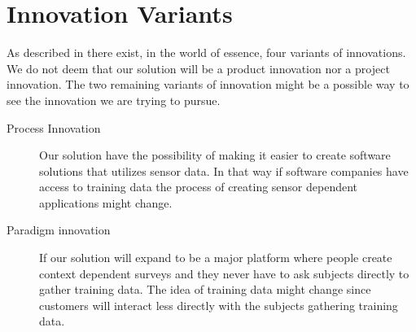 
\section{Innovation Variants}
\label{sec:innovation_variants}
As described in  there exist, in the world of essence, four variants of innovations. We do not deem that our solution will be a product innovation nor a project innovation. The two remaining variants of innovation might be a possible way to see the innovation we are trying to pursue.

\begin{description}
	\item[Process Innovation] Our solution have the possibility of making it easier to create software solutions that utilizes sensor data. In that way if software companies have access to training data the process of creating sensor dependent applications might change.
	\item[Paradigm innovation] If our solution will expand to be a major platform where people create context dependent surveys and they never have to ask subjects directly to gather training data. The idea of training data might change since customers will interact less directly with the subjects gathering training data.
\end{description}




